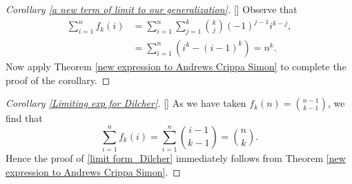 \documentclass[11pt,reqno]{amsart}
\renewcommand{\(}{\left\(}
\renewcommand{\)}{\right\)}
\renewcommand{\[}{\left\[}
\renewcommand{\]}{\right\]}
\numberwithin{equation}{section}
\theoremstyle{plain}
\begin{document}
\begin{proof}[Corollary \ref{a new term of limit to our generalization}][]
Observe that
\begin{align*}
\sum_{i=1}^n f_k(i) &= \sum_{i=1}^n \sum_{j=1}^k {k \choose j}(-1)^{j-1}i^{k-j},\\
&= \sum_{i=1}^n \left( i^k - (i-1)^k \right) = n^k.
\end{align*}
Now apply Theorem \ref{new expression to Andrews Crippa Simon} to complete the proof of the corollary.
\end{proof}


\begin{proof}[Corollary \ref{Limiting exp for Dilcher}][]
As we have taken $f_k(n) = {n-1 \choose k-1}$,  we find that
$$
\sum_{i=1}^n f_k(i)  = \sum_{i=1}^n {i-1 \choose k-1} = {n \choose k}. 
$$
Hence the proof of \eqref{limit form_Dilcher}  immediately follows from Theorem \ref{new expression to Andrews Crippa Simon}.  
\end{proof}
\end{document}
